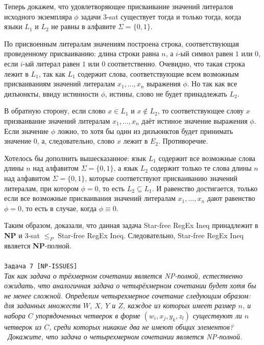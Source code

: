 \documentclass[10pt]{article}
\begin{document}
\medskip\par
Теперь докажем, что удовлетворяющее присваивание значений литералов исходного экземпляра $\phi$ задачи $3$-sat существует тогда и только тогда, когда языки $L_1$ и $L_2$ не равны в алфавите $\Sigma=\{0, 1\}.$
\medskip\par По присвоенным литералам значениям построена строка, соответствующая проведенному присваиванию: длина строки равна $n$, а $i$-ый символ равен $1$ или $0$, если $i$-ый литерал равен $1$ или $0$ соответственно. Очевидно, что такая строка лежит в $L_1$, так как $L_1$ содержит слова, соответствующие всем возможным присваиваниям значений литералам $x_1, \dots, x_n$ выражения $\phi$. Но так как все дизъюнкты, ввиду истинности $\phi$, истины, слово не будет принадлежать $L_2$.
\medskip\par В обратную сторону, если слово $x\in L_1$ и $x\not\in L_2$, то соответствующее слову $x$ призваивание значений литералам $x_1, \ldots, x_n$ даёт истиное значение выражения $\phi$. Если значение $\phi$ ложно, то хотя бы один из дизъюнктов будет принимать значение $0$, а, следовательно, слово $x$ лежит в $E_2$. Противоречие.
\medskip\par Хотелось бы дополнить вышесказанное: язык $L_1$ содержит все возможные слова длины $n$ над алфавитом $\Sigma=\{0, 1\}$, а язык $L_2$ содержит только те слова  длины $n$ над алфавитом $\Sigma=\{0, 1\}$, которые соответствуют присваиванию значений литералам, при котором $\phi = 0$, то есть $L_2\subseteq L_1$. И равенство достигается, только если все возможные присваивания значений литералам $x_1, \ldots, x_n$ дают равенство $\phi =0$, то есть в случае, когда $\phi \equiv 0$.
\medskip\par Таким образом, доказали, что данная задача Star-free RegEx Ineq принадлежит в \textbf{NP} и $3$-sat $\leq_P$ Star-free RegEx Ineq. Следовательно, Star-free RegEx Ineq является \textbf{NP}-полной.
\ \\[0.5 cm]
\hline
\ \\[0.5 cm]
{\large\texttt{Задача 7 [NP-ISSUES]}}
\ \\[0.1cm]
\textit{
Так как задача о трёхмерном сочетании является NP-полной, естественно ожидать, что аналогичная задача о четырёхмерном сочетании будет хотя бы не менее сложной. Определим четырехмерное сочетание следующим образом: для заданных множеств $W$, $X$, $Y$ и $Z$, каждое из которых имеет размер $n$, и набора $C$ упорядоченных четверок в форме $(w_i, x_j, y_k , z_l)$ существуют ли $n$ четверок из $C$, среди которых никакие два не имеют общих элементов?
\\ \
Докажите, что задача о четырехмерном сочетании является NP-полной.
}
\end{document}
